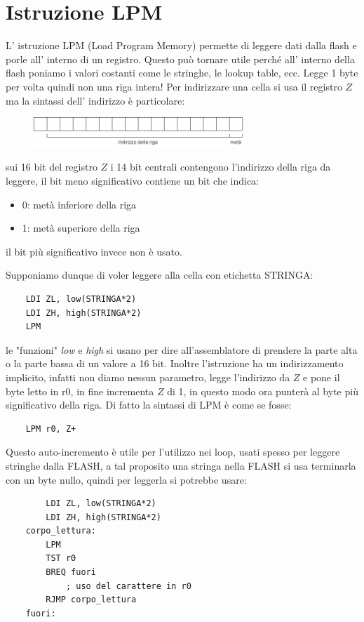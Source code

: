 \section{Istruzione LPM}
L' istruzione LPM (Load Program Memory) permette di leggere dati dalla flash e porle all' interno di un registro.
Questo può tornare utile perché all' interno della flash poniamo i valori costanti come le stringhe, le lookup table, ecc.
Legge 1 byte per volta quindi non una riga intera!
Per indirizzare una cella si usa il registro $Z$ ma la sintassi dell' indirizzo è particolare:
\begin{figure}[H]
    \centering
    \includegraphics[width=300px]{images/8_LPM/LPM_sintassi.png}
\end{figure}
sui 16 bit del registro $Z$ i 14 bit centrali contengono l'indirizzo della riga da leggere, il bit meno significativo contiene un bit che indica:
\begin{itemize}
    \item 0: metà inferiore della riga
    \item 1: metà superiore della riga
\end{itemize}
il bit più significativo invece non è usato.

Supponiamo dunque di voler leggere alla cella con etichetta STRINGA:
\begin{verbatim}
    LDI ZL, low(STRINGA*2)
    LDI ZH, high(STRINGA*2)
    LPM
\end{verbatim}
le "funzioni" \emph{low} e \emph{high} si usano per dire all'assemblatore di prendere la parte alta o la parte bassa di un valore a 16 bit.
Inoltre l'istruzione ha un indirizzamento implicito, infatti non diamo nessun parametro, legge l'indirizzo da $Z$ e pone il byte letto in r0, in fine incrementa $Z$ di 1, in questo modo ora punterà al byte più significativo della riga.
Di fatto la sintassi di LPM è come se fosse:
\begin{verbatim}
    LPM r0, Z+
\end{verbatim}

Questo auto-incremento è utile per l'utilizzo nei loop, usati spesso per leggere stringhe dalla FLASH, a tal proposito una stringa nella FLASH si usa terminarla con un byte nullo, quindi per leggerla si potrebbe usare:
\begin{verbatim}
        LDI ZL, low(STRINGA*2)
        LDI ZH, high(STRINGA*2)
    corpo_lettura:
        LPM
        TST r0
        BREQ fuori
            ; uso del carattere in r0
        RJMP corpo_lettura
    fuori:
\end{verbatim}












